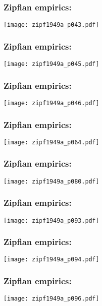 \begin{frame}
  \frametitle{Zipfian empirics:}

    \centering
  \texttt{[image: zipf1949a\_p043.pdf]}

\end{frame}

\begin{frame}
  \frametitle{Zipfian empirics:}

    \centering
  \texttt{[image: zipf1949a\_p045.pdf]}

\end{frame}

\begin{frame}
  \frametitle{Zipfian empirics:}

    \centering
  \texttt{[image: zipf1949a\_p046.pdf]}

\end{frame}

\begin{frame}
  \frametitle{Zipfian empirics:}

    \centering
  \texttt{[image: zipf1949a\_p064.pdf]}

\end{frame}

\begin{frame}
  \frametitle{Zipfian empirics:}

    \centering
  \texttt{[image: zipf1949a\_p080.pdf]}

\end{frame}

\begin{frame}
  \frametitle{Zipfian empirics:}

    \centering
  \texttt{[image: zipf1949a\_p093.pdf]}

\end{frame}

\begin{frame}
  \frametitle{Zipfian empirics:}

    \centering
  \texttt{[image: zipf1949a\_p094.pdf]}

\end{frame}

\begin{frame}
  \frametitle{Zipfian empirics:}

    \centering
  \texttt{[image: zipf1949a\_p096.pdf]}

\end{frame}

